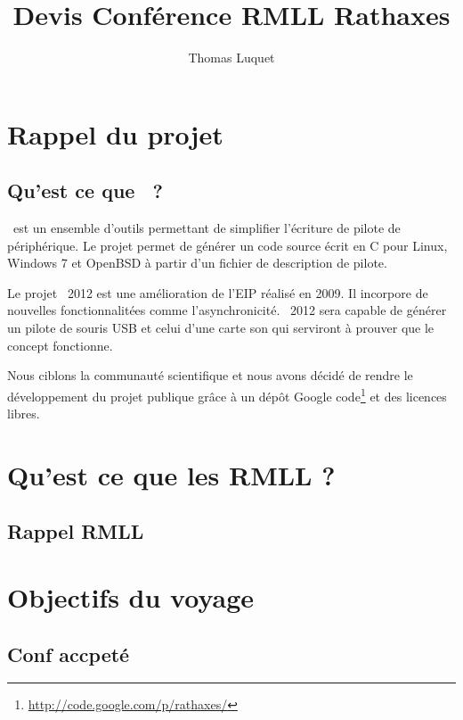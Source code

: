 \documentclass{rtxreport}
\author{Thomas Luquet}
\title{Devis Conférence RMLL Rathaxes}
\begin{document}
\maketitle

\rtxmaketitleblock

\tableofcontents

\chapter{Rappel du projet}

\section{Qu'est ce que \rtx\ ?}

\rtx\ est un ensemble d'outils permettant de simplifier l'écriture de pilote de
périphérique. Le projet permet de générer un code source écrit en C pour Linux,
Windows 7 et OpenBSD à partir d'un fichier de description de pilote.

Le projet \rtx\ 2012 est une amélioration de l'EIP réalisé en 2009. Il
incorpore de nouvelles fonctionnalitées comme l’asynchronicité. \rtx\ 2012 sera
capable de générer un pilote de souris USB et celui d'une carte son qui
serviront à prouver que le concept fonctionne.

Nous ciblons la communauté scientifique et nous avons décidé de rendre le
développement du projet publique grâce à un dépôt Google
code\footnote{\url{http://code.google.com/p/rathaxes/}} et des licences libres.



\chapter{Qu'est ce que les RMLL ?}

\section{Rappel RMLL}

\chapter{Objectifs du voyage}

\section{Conf accpeté}
\end{document}
